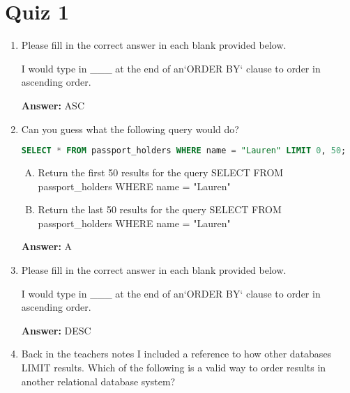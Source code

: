 \documentclass[12pt]{article}
\begin{document}
\bigskip

\section{Quiz 1}

\bigskip

\begin{enumerate}[1.]
    \item

    Please fill in the correct answer in each blank provided below.

    \bigskip

    I would type in \_\_\_  at the end of an`ORDER BY` clause to order in ascending order.

    \bigskip

    \textbf{Answer:} ASC

    \item

    Can you guess what the following query would do?

    \bigskip

    \begin{lstlisting}[language=SQL]
    SELECT * FROM passport_holders WHERE name = "Lauren" LIMIT 0, 50;
    \end{lstlisting}

    \bigskip

    \begin{enumerate}[A.]
        \item Return the first 50 results for the query SELECT \* FROM passport\_holders WHERE name = "Lauren"
        \item Return the last 50 results for the query SELECT \* FROM passport\_holders WHERE name = "Lauren"
    \end{enumerate}

    \textbf{Answer:} A


    \item

    Please fill in the correct answer in each blank provided below.

    \bigskip

    I would type in \_\_\_  at the end of an`ORDER BY` clause to order in ascending order.

    \bigskip

    \textbf{Answer:} DESC

    \item

    Back in the teachers notes I included a reference to how other databases
    LIMIT results. Which of the following is a valid way to order results in
    another relational database system?


\end{enumerate}
\end{document}
